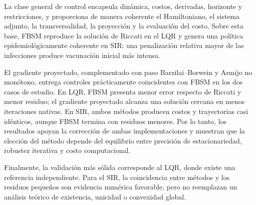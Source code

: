 \documentclass[11pt,a4paper]{article}
\begin{document}
La clase general de control encapsula dinámica, costos, derivadas, horizonte y restricciones, y proporciona de manera coherente el Hamiltoniano, el sistema adjunto, la transversalidad, la proyección y la evaluación del costo. Sobre esta base, FBSM reproduce la solución de Riccati en el LQR y genera una política epidemiológicamente coherente en SIR: una penalización relativa mayor de las infecciones produce vacunación inicial más intensa.

El gradiente proyectado, complementado con paso Barzilai--Borwein y Armijo no monótono, entrega controles prácticamente coincidentes con FBSM en los dos casos de estudio. En LQR, FBSM presenta menor error respecto de Riccati y menor residuo; el gradiente proyectado alcanza una solución cercana en menos iteraciones nativas. En SIR, ambos métodos producen costos y trayectorias casi idénticos, aunque FBSM termina con residuos menores. Por lo tanto, los resultados apoyan la corrección de ambas implementaciones y muestran que la elección del método depende del equilibrio entre precisión de estacionariedad, robustez iterativa y costo computacional.

Finalmente, la validación más sólida corresponde al LQR, donde existe una referencia independiente. Para el SIR, la coincidencia entre métodos y los residuos pequeños son evidencia numérica favorable, pero no reemplazan un análisis teórico de existencia, unicidad o convexidad global.
\end{document}
